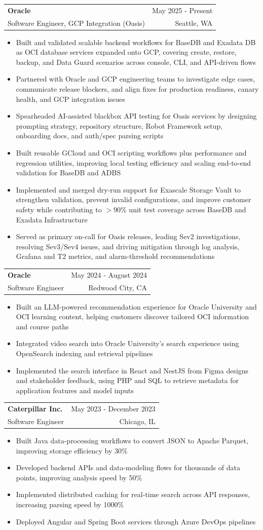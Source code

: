 \documentclass[letterpaper,11pt]{article}
\makeatletter
\newcommand{\resumeItem}[1]{
  \item\small{
    {#1 \vspace{-2pt}}
  }
}
\newcommand{\resumeSubheading}[4]{
  \vspace{-2pt}\item
    \begin{tabular*}{0.97\textwidth}[t]{l@{\extracolsep{\fill}}r}
      \textbf{#1} & #2 \\
      {\small#3} & {\small #4} \\
    \end{tabular*}\vspace{-7pt}
}
\newcommand{\resumeItemListStart}{\begin{itemize}}
\newcommand{\resumeItemListEnd}{\end{itemize}\vspace{-5pt}}
\makeatother
\begin{document}
    \resumeSubheading
  {Oracle}{May 2025 - Present}
  {Software Engineer, GCP Integration (Oasis)}{Seattle, WA}
  \resumeItemListStart
    \resumeItem{Built and validated scalable backend workflows for BaseDB and Exadata DB as OCI database services expanded onto GCP, covering create, restore, backup, and Data Guard scenarios across console, CLI, and API-driven flows}
    \resumeItem{Partnered with Oracle and GCP engineering teams to investigate edge cases, communicate release blockers, and align fixes for production readiness, canary health, and GCP integration issues}
    \resumeItem{Spearheaded AI-assisted blackbox API testing for Oasis services by designing prompting strategy, repository structure, Robot Framework setup, onboarding docs, and auth/spec parsing scripts}
    \resumeItem{Built reusable GCloud and OCI scripting workflows plus performance and regression utilities, improving local testing efficiency and scaling end-to-end validation for BaseDB and ADBS}
    \resumeItem{Implemented and merged dry-run support for Exascale Storage Vault to strengthen validation, prevent invalid configurations, and improve customer safety while contributing to $>$90\% unit test coverage across BaseDB and Exadata Infrastructure}
    \resumeItem{Served as primary on-call for Oasis releases, leading Sev2 investigations, resolving Sev3/Sev4 issues, and driving mitigation through log analysis, Grafana and T2 metrics, and alarm-threshold recommendations}
  \resumeItemListEnd

    \resumeSubheading
      {Oracle}{May 2024 - August 2024}
      {Software Engineer}{Redwood City, CA}
      \resumeItemListStart
        \resumeItem{Built an LLM-powered recommendation experience for Oracle University and OCI learning content, helping customers discover tailored OCI information and course paths}
        \resumeItem{Integrated video search into Oracle University's search experience using OpenSearch indexing and retrieval pipelines}
        \resumeItem{Implemented the search interface in React and NestJS from Figma designs and stakeholder feedback, using PHP and SQL to retrieve metadata for application features and model inputs}
      \resumeItemListEnd

    \resumeSubheading
      {Caterpillar Inc.}{May 2023 - December 2023}
      {Software Engineer}{Chicago, IL}
      \resumeItemListStart
        \resumeItem{Built Java data-processing workflows to convert JSON to Apache Parquet, improving storage efficiency by 30\%}
        \resumeItem{Developed backend APIs and data-modeling flows for thousands of data points, improving analysis speed by 50\%}
        \resumeItem{Implemented distributed caching for real-time search across API responses, increasing parsing speed by 1000\%}
        \resumeItem{Deployed Angular and Spring Boot services through Azure DevOps pipelines}
      \resumeItemListEnd
\end{document}
